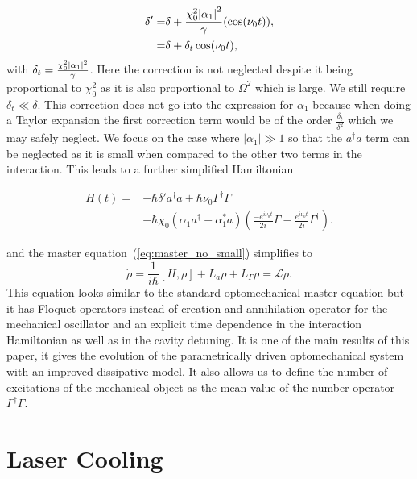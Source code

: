 \documentclass[reprint, amsmath,amssymb, aps,pra]{revtex4-1}
\begin{document}
\begin{align}
\delta' =& \delta +\frac{\chi_0^2 \abs{\alpha_1}^2}{\gamma} (\cos(\nu_0 t)), \nonumber\\
=& \delta + \delta_t\cos(\nu_0 t),
\end{align} with $\delta_t=\frac{\chi_0^2 \abs{\alpha_1}^2}{\gamma}$.  Here the correction is not neglected despite it being proportional to $\chi_0^2$ as it is also proportional to $\Omega^2$ which is large. We still require $\delta_t\ll\delta$. This correction does not go into the expression for $\alpha_1$ because when doing a Taylor expansion the first correction term would be of the order $\frac{\delta_t}{\delta^2}$ which we may safely neglect.
We focus on the case where $|\alpha_1| \gg 1$
\cite{BarberisLC} so that the $a^\dagger a$ term can be neglected as
it is small when compared to the other two terms in the interaction.
This leads to a further simplified Hamiltonian

\begin{align} \label{LCHamiltonian}
H(t) =& -\hbar \delta' a^{\dagger}a +\hbar\nu_0\Gamma^{\dagger}\Gamma \\
&+\hbar \chi_0(\alpha_1 a^{\dagger}+\alpha^*_1 a)(\frac{-e^{i\nu_0 t}}{2i}\Gamma-\frac{
e^{i\nu_0 t}}{2i} \nonumber\Gamma^{\dagger}).
\end{align} 

 and the master
equation~(\ref{eq:master_no_small}) simplifies to
\begin{equation}\label{LCMasterEq}
\dot{\rho} = \frac{1}{i\hbar}[H,\rho] +L_a\rho + L_\Gamma \rho = \mathcal{L}\rho.
\end{equation}
This equation looks similar to the standard optomechanical master
equation but it has Floquet operators instead of creation and
annihilation operator for the mechanical oscillator and an explicit
time dependence in the interaction Hamiltonian as well as in the
cavity detuning. It is one of the main results of this paper, it gives
the evolution of the parametrically driven optomechanical system with
an improved dissipative model. It also allows us to define the number
of excitations of the mechanical object as the mean value of the
number operator $\Gamma^\dagger\Gamma$.

\section{Laser Cooling}\label{LasCool}
\end{document}
